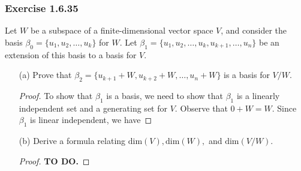 \subsubsection{Exercise 1.6.35} Let \( W  \) be a subspace of a finite-dimensional vector space \( V  \), and consider the basis \( \beta_{0} =  \{ u_{1}, u_{2}, \dots, u_{k } \}   \) for \( W  \). Let \( \beta_{1} = \{ u_{1}, u_{2}, \dots, u_{k }, u_{k+1}, \dots, u_{n} \}  \) be an extension of this basis to a basis for \( V  \).
\begin{enumerate}
    \item[(a)] Prove that \( \beta_{2} = \{ u_{k+1} + W , u_{k+2} + W, \dots, u_{n} + W  \}  \) is a basis for \( V / W  \).
        \begin{proof}
            To show that \( \beta_{1}  \) is a basis, we need to show that \( \beta_{1} \) is a linearly independent set and a generating set for \( V  \). Observe that \( 0 + W = W  \). Since \( \beta_{1}  \) is linear independent, we have
        \end{proof}
    \item[(b)] Derive a formula relating \( \text{dim}(V), \text{dim}(W),  \) and \( \text{dim}(V / W ) \).
        \begin{proof}
        \textbf{TO DO.}
        \end{proof}
\end{enumerate}

